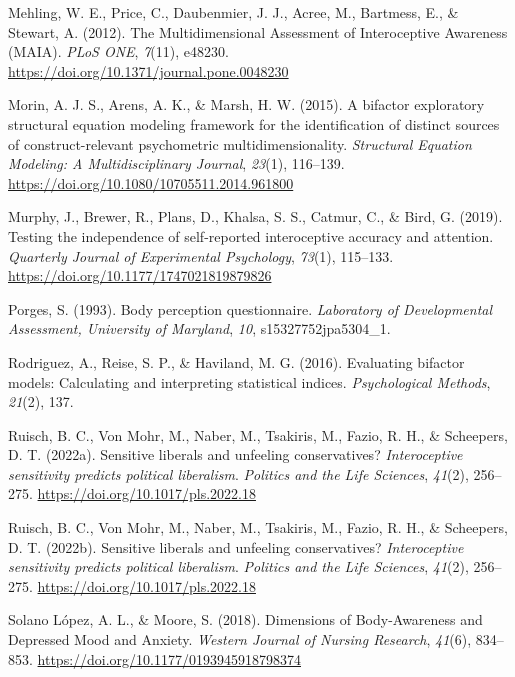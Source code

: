 \documentclass[
  man,
  floatsintext,
  longtable,
  nolmodern,
  notxfonts,
  notimes,
  colorlinks=true,linkcolor=blue,citecolor=blue,urlcolor=blue]{apa7}
\newlength{\cslhangindent}
\newenvironment{CSLReferences}[2] %
 {\begin{list}{}{%
  \setlength{\itemindent}{0pt}
  \setlength{\leftmargin}{0pt}
  \setlength{\parsep}{0pt}
  \ifodd #1
   \setlength{\leftmargin}{\cslhangindent}
   \setlength{\itemindent}{-1\cslhangindent}
  \fi
  \setlength{\itemsep}{#2\baselineskip}}}
 {\end{list}}
\begin{document}
\begin{CSLReferences}{1}{0}
Mehling, W. E., Price, C., Daubenmier, J. J., Acree, M., Bartmess, E.,
\& Stewart, A. (2012). The Multidimensional Assessment of Interoceptive
Awareness (MAIA). \emph{PLoS ONE}, \emph{7}(11), e48230.
\url{https://doi.org/10.1371/journal.pone.0048230}

Morin, A. J. S., Arens, A. K., \& Marsh, H. W. (2015). A bifactor
exploratory structural equation modeling framework for the
identification of distinct sources of construct-relevant psychometric
multidimensionality. \emph{Structural Equation Modeling: A
Multidisciplinary Journal}, \emph{23}(1), 116--139.
\url{https://doi.org/10.1080/10705511.2014.961800}

Murphy, J., Brewer, R., Plans, D., Khalsa, S. S., Catmur, C., \& Bird,
G. (2019). Testing the independence of self-reported interoceptive
accuracy and attention. \emph{Quarterly Journal of Experimental
Psychology}, \emph{73}(1), 115--133.
\url{https://doi.org/10.1177/1747021819879826}

Porges, S. (1993). Body perception questionnaire. \emph{Laboratory of
Developmental Assessment, University of Maryland}, \emph{10},
s15327752jpa5304\_1.

Rodriguez, A., Reise, S. P., \& Haviland, M. G. (2016). Evaluating
bifactor models: Calculating and interpreting statistical indices.
\emph{Psychological Methods}, \emph{21}(2), 137.

Ruisch, B. C., Von Mohr, M., Naber, M., Tsakiris, M., Fazio, R. H., \&
Scheepers, D. T. (2022a). Sensitive liberals and unfeeling
conservatives? {\emph{Interoceptive sensitivity predicts political
liberalism}}. \emph{Politics and the Life Sciences}, \emph{41}(2),
256--275. \url{https://doi.org/10.1017/pls.2022.18}

Ruisch, B. C., Von Mohr, M., Naber, M., Tsakiris, M., Fazio, R. H., \&
Scheepers, D. T. (2022b). Sensitive liberals and unfeeling
conservatives? {\emph{Interoceptive sensitivity predicts political
liberalism}}. \emph{Politics and the Life Sciences}, \emph{41}(2),
256--275. \url{https://doi.org/10.1017/pls.2022.18}

Solano López, A. L., \& Moore, S. (2018). Dimensions of Body-Awareness
and Depressed Mood and Anxiety. \emph{Western Journal of Nursing
Research}, \emph{41}(6), 834--853.
\url{https://doi.org/10.1177/0193945918798374}


\end{CSLReferences}
\end{document}
